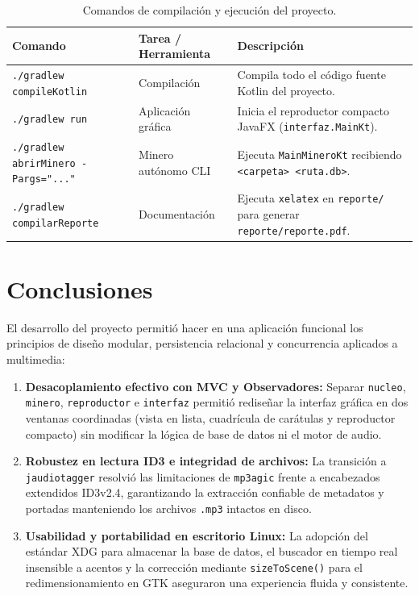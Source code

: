 \documentclass[12pt,a4paper]{article}
\begin{document}
\begin{table}[htbp]
\centering
\footnotesize
\renewcommand{\arraystretch}{0.94}
\begin{tabularx}{\textwidth}{p{5.8cm} l X}
\toprule
\textbf{Comando} & \textbf{Tarea / Herramienta} & \textbf{Descripción} \\
\midrule
\texttt{./gradlew compileKotlin} & Compilación & Compila todo el código fuente Kotlin del proyecto. \\
\texttt{./gradlew run} & Aplicación gráfica & Inicia el reproductor compacto JavaFX (\texttt{interfaz.MainKt}). \\
\texttt{./gradlew abrirMinero -Pargs="..."} & Minero autónomo CLI & Ejecuta \texttt{MainMineroKt} recibiendo \texttt{<carpeta> <ruta.db>}. \\
\texttt{./gradlew compilarReporte} & Documentación & Ejecuta \texttt{xelatex} en \texttt{reporte/} para generar \texttt{reporte/reporte.pdf}. \\
\bottomrule
\end{tabularx}
\caption{Comandos de compilación y ejecución del proyecto.}
\label{tab:gradle}
\end{table}

\section{Conclusiones}

El desarrollo del proyecto permitió hacer en una aplicación funcional los principios de diseño modular, persistencia relacional y concurrencia aplicados a multimedia:
\begin{enumerate}
    \item \textbf{Desacoplamiento efectivo con MVC y Observadores:} Separar \texttt{nucleo}, \texttt{minero}, \texttt{reproductor} e \texttt{interfaz} permitió rediseñar la interfaz gráfica en dos ventanas coordinadas (vista en lista, cuadrícula de carátulas y reproductor compacto) sin modificar la lógica de base de datos ni el motor de audio.
    \item \textbf{Robustez en lectura ID3 e integridad de archivos:} La transición a \texttt{jaudiotagger} resolvió las limitaciones de \texttt{mp3agic} frente a encabezados extendidos ID3v2.4, garantizando la extracción confiable de metadatos y portadas manteniendo los archivos \texttt{.mp3} intactos en disco.
    \item \textbf{Usabilidad y portabilidad en escritorio Linux:} La adopción del estándar XDG para almacenar la base de datos, el buscador en tiempo real insensible a acentos y la corrección mediante \texttt{sizeToScene()} para el redimensionamiento en GTK aseguraron una experiencia fluida y consistente.
\end{enumerate}
\end{document}
